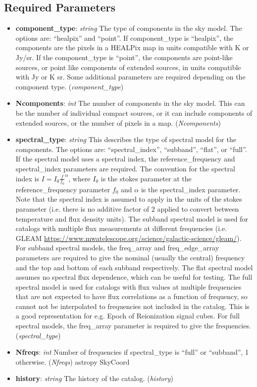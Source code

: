 \documentclass[11pt, oneside]{article}
\begin{document}
\subsection{Required Parameters}
\label{sec:req_params}
\begin{itemize}

\item \textbf{component\_type}: \textit{string} The type of components in the sky model. The options are: ``healpix'' and ``point''.
If component\_type is ``healpix'', the components are the pixels in a HEALPix map in units compatible with K or Jy/sr.
If the component\_type is ``point'', the components are point-like sources, or point like components of extended sources,
in units compatible with Jy or K sr. Some additional parameters are required depending on the component type. (\textit{component\_type})

\item \textbf{Ncomponents}: \textit{int} The number of components in the sky model. This can be the number of individual
compact sources, or it can include components of extended sources, or the number of pixels in a map. (\textit{Ncomponents})

\item \textbf{spectral\_type}: \textit{string} This describes the type of spectral model for the components. The options are:
``spectral\_index'', ``subband'', ``flat'', or ``full''. If the spectral model uses a spectral index, the reference\_frequency and
spectral\_index parameters are required. The convention for the spectral index is $I=I_0 \frac{f}{f_0}^{\alpha}$, where
$I_0$ is the stokes parameter at the reference\_frequency parameter $f_0$ and $\alpha$ is the spectral\_index parameter.
Note that the spectral index is assumed to apply in the units of the stokes parameter (i.e. there is no additive factor of 2 applied
to convert between temperature and flux density units).
The subband spectral model is used for catalogs with multiple flux measurements at different frequencies (i.e. GLEAM
\url{https://www.mwatelescope.org/science/galactic-science/gleam/}). For subband  spectral models, the freq\_array
and freq\_edge\_array parameters are required to give the nominal (usually the central) frequency and the top and bottom of
each subband respectively.
The flat spectral model assumes no spectral flux dependence, which can be useful for testing.
The full spectral model is used for catalogs with flux values at multiple frequencies that are not expected to have flux correlations as a function of frequency, so cannot not be interpolated to frequencies not included in the catalog. This is a good representation for e.g. Epoch of Reionization signal cubes.
For full  spectral models, the freq\_array parameter is required to give the frequencies.
(\textit{spectral\_type})

\item \textbf{Nfreqs}: \textit{int}
Number of frequencies if spectral\_type is ``full'' or ``subband'', 1 otherwise. (\textit{Nfreqs})
astropy SkyCoord
\item \textbf{history}: \textit{string} The history of the catalog. (\textit{history})
\end{itemize}
\end{document}
